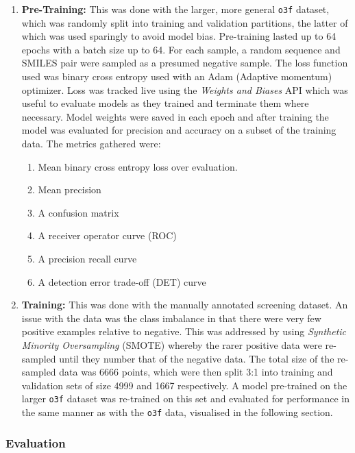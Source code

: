 \documentclass[16pt]{book}
\begin{document}
\begin{enumerate}
	\item \textbf{Pre-Training:} This was done with the larger, more general \texttt{o3f} dataset, which was randomly split into training and validation partitions, the latter of which was used sparingly to avoid model bias.
	Pre-training lasted up to 64 epochs with a batch size up to 64.
	For each sample, a random sequence and SMILES pair were sampled as a presumed negative sample.
	The loss function used was binary cross entropy used with an Adam (Adaptive momentum) optimizer.
		Loss was tracked live using the \textit{Weights and Biases} API which was useful to evaluate models as they trained and terminate them where necessary.
	Model weights were saved in each epoch and after training the model was evaluated for precision and accuracy on a subset of the training data.
	The metrics gathered were: 

		\begin{enumerate}
			\item Mean binary cross entropy loss over evaluation.
			\item Mean precision
			\item A confusion matrix
			\item A receiver operator curve (ROC)
			\item A precision recall curve
			\item A detection error trade-off (DET) curve
		\end{enumerate}

	\item \textbf{Training:} This was done with the manually annotated screening dataset.
	An issue with the data was the class imbalance in that there were very few positive examples relative to negative.
		This was addressed by using \textit{Synthetic Minority Oversampling} (SMOTE) whereby the rarer positive data were re-sampled until they number that of the negative data.
	The total size of the re-sampled data was 6666 points, which were then split 3:1 into training and validation sets of size 4999 and 1667 respectively.
		A model pre-trained on the larger \texttt{o3f} dataset was re-trained on this set and evaluated for performance in the same manner as with the \texttt{o3f} data, visualised in the following section.
\end{enumerate}

\subsubsection{Evaluation}
\end{document}
